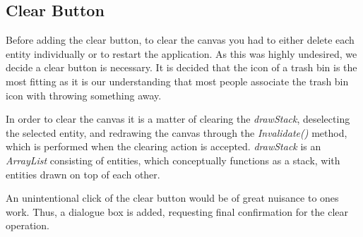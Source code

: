 \subsection{Clear Button}
Before adding the clear button, to clear the canvas you had to either delete each entity individually or to restart the application. 
As this was highly undesired, we decide a clear button is necessary.
It is decided that the icon of a trash bin is the most fitting as it is our understanding that most people associate the trash bin icon with throwing something away.

In order to clear the canvas it is a matter of clearing the \textit{drawStack}, deselecting the selected entity, and redrawing the canvas through the \textit{Invalidate()} method, which is performed when the clearing action is accepted. 
\textit{drawStack} is an \textit{ArrayList} consisting of entities, which conceptually functions as a stack, with entities drawn on top of each other.

An unintentional click of the clear button would be of great nuisance to ones work. 
Thus, a dialogue box is added, requesting final confirmation for the clear operation.